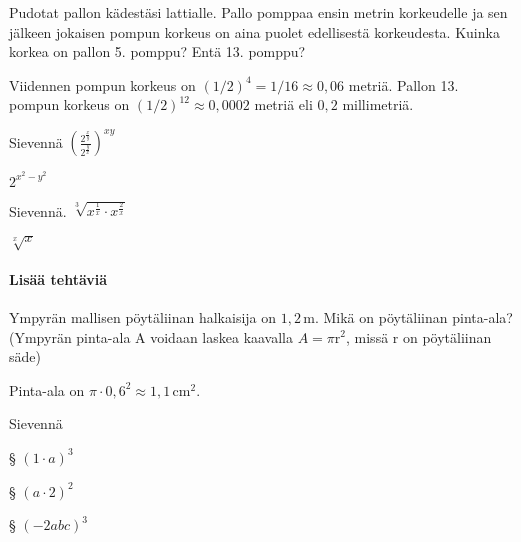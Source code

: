 \begin{tehtavasivu}
\begin{tehtava}
        Pudotat pallon kädestäsi lattialle. Pallo pomppaa ensin metrin korkeudelle ja sen jälkeen jokaisen pompun korkeus on aina puolet edellisestä korkeudesta. Kuinka korkea on pallon 5. pomppu? Entä 13. pomppu?     
        \begin{vastaus}
        Viidennen pompun korkeus on $(1/2)^4=1/16 \approx 0,06$ metriä. Pallon 13. pompun korkeus on $(1/2)^{12} \approx 0,0002$ metriä eli $0,2$ millimetriä.
        \end{vastaus}
\end{tehtava}

\begin{tehtava}
Sievennä
$( \frac{2^{\frac{x}{y}}}{2^{\frac{y}{x}}} )^{xy}$
\begin{vastaus}
 $2^{x^2 - y^2}$
\end{vastaus}


\end{tehtava}

\begin{tehtava}
Sievennä.
$\sqrt[3]{ x^{\frac{1}{x}} \cdot x^{\frac{2}{x}} }$
 \begin{vastaus}
  $\sqrt[x]{x}$
 \end{vastaus}
\end{tehtava}
 
\paragraph*{Lisää tehtäviä}

    \begin{tehtava}
        Ympyrän mallisen pöytäliinan halkaisija on $1,2$\,m.  Mikä on pöytäliinan pinta-ala? (Ympyrän pinta-ala A voidaan laskea kaavalla $A=\pi\text{r}^2$, missä r on pöytäliinan säde)
        \begin{vastaus}
        Pinta-ala on $\pi \cdot 0,6^2 \approx 1,1\,$cm$^2$.
        \end{vastaus}
\end{tehtava}

 \begin{tehtava}
        Sievennä 
       
§ $(1\cdot a)^3$ 
       
§ $(a\cdot 2)^2$ 
       
§ $(-2abc)^3$ 
       

\end{tehtava}
\end{tehtavasivu}
